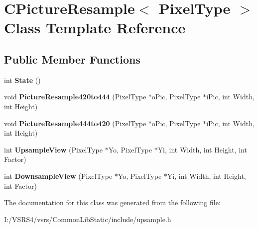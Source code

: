 \hypertarget{class_c_picture_resample}{}\section{C\+Picture\+Resample$<$ Pixel\+Type $>$ Class Template Reference}
\label{class_c_picture_resample}
\subsection*{Public Member Functions}
\begin{DoxyCompactItemize}
\item 
\mbox{\label{class_c_picture_resample_ad6a372dd43ac0eb10eb2fe406a20dd09}} 
int {\bfseries State} ()
\item 
\mbox{\label{class_c_picture_resample_a0f1da31e8129c4536a4481f70f40ed3e}} 
void {\bfseries Picture\+Resample420to444} (Pixel\+Type $\ast$o\+Pic, Pixel\+Type $\ast$i\+Pic, int Width, int Height)
\item 
\mbox{\label{class_c_picture_resample_ac653efedc97747d26296e04b3582b7b5}} 
void {\bfseries Picture\+Resample444to420} (Pixel\+Type $\ast$o\+Pic, Pixel\+Type $\ast$i\+Pic, int Width, int Height)
\item 
\mbox{\label{class_c_picture_resample_a99a7ff2f24b1ba7b094aeabb2afbbaa4}} 
int {\bfseries Upsample\+View} (Pixel\+Type $\ast$Yo, Pixel\+Type $\ast$Yi, int Width, int Height, int Factor)
\item 
\mbox{\label{class_c_picture_resample_a56b5057785447eb149f1b8be44a1a7ff}} 
int {\bfseries Downsample\+View} (Pixel\+Type $\ast$Yo, Pixel\+Type $\ast$Yi, int Width, int Height, int Factor)
\end{DoxyCompactItemize}


The documentation for this class was generated from the following file\+:\begin{DoxyCompactItemize}
\item 
I\+:/\+V\+S\+R\+S4/vsrs/\+Common\+Lib\+Static/include/upsample.\+h\end{DoxyCompactItemize}
